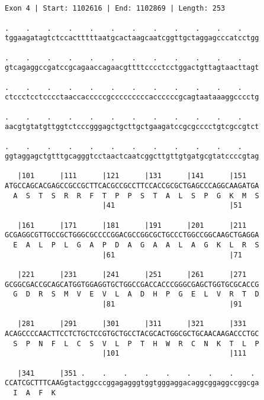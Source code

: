 \documentclass{article}
\begin{document}
\begin{Verbatim}
                                       
 
Exon 4 | Start: 1102616 | End: 1102869 | Length: 253
 
.    .    .    .    .    .    .    .    .    .    .    .    
tggaagatagtctccactttttaatgcactaagcaatcggttgctaggagcccatcctgg
                                                            
.    .    .    .    .    .    .    .    .    .    .    .    
gtcagaggccgatccgcagaaccagaacgttttcccctcctggactgttagtaacttagt
                                                            
.    .    .    .    .    .    .    .    .    .    .    .    
ctccctcctcccctaaccacccccgcccccccccaccccccgcagtaataaaggcccctg
                                                            
.    .    .    .    .    .    .    .    .    .    .    .    
aacgtgtatgttggtctcccgggagctgcttgctgaagatccgcgcccctgtcgccgtct
                                                            
.    .    .    .    .    .    .    .    .    .    .    .    
ggtaggagctgtttgcagggtcctaactcaatcggcttgttgtgatgcgtatccccgtag
                                                            
   |101      |111      |121      |131      |141      |151   
ATGCCAGCACGAGCCGCCGCTTCACGCCGCCTTCCACCGCGCTGAGCCCAGGCAAGATGA
  A  S  T  S  R  R  F  T  P  P  S  T  A  L  S  P  G  K  M  S
                       |41                           |51    
  
   |161      |171      |181      |191      |201      |211   
GCGAGGCGTTGCCGCTGGGCGCCCCGGACGCCGGCGCTGCCCTGGCCGGCAAGCTGAGGA
  E  A  L  P  L  G  A  P  D  A  G  A  A  L  A  G  K  L  R  S
                       |61                           |71    
  
   |221      |231      |241      |251      |261      |271   
GCGGCGACCGCAGCATGGTGGAGGTGCTGGCCGACCACCCGGGCGAGCTGGTGCGCACCG
  G  D  R  S  M  V  E  V  L  A  D  H  P  G  E  L  V  R  T  D
                       |81                           |91    
  
   |281      |291      |301      |311      |321      |331   
ACAGCCCCAACTTCCTCTGCTCCGTGCTGCCTACGCACTGGCGCTGCAACAAGACCCTGC
  S  P  N  F  L  C  S  V  L  P  T  H  W  R  C  N  K  T  L  P
                       |101                          |111   
  
   |341      |351 .    .    .    .    .    .    .    .    . 
CCATCGCTTTCAAGgtactggcccggagagggtggtgggaggacaggcggaggccggcga
  I  A  F  K                                                
                                                            

\end{Verbatim}
\end{document}

